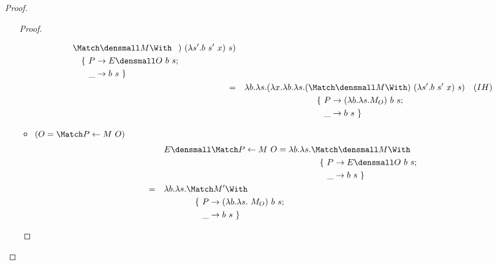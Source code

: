 \begin{proof}
\begin{enumerate}[(a)]
\begin{proof}
\begin{itemize}
\begin{align*}
            \begin{aligned}[t]
              &\Match \den{M} \With \\
              &\quad
              \begin{aligned}[t]
                \{~
                P &\to E\den{O}~b~s; \\
                \_ &\to b~s
                ~\}
              \end{aligned}
            \end{aligned}
            )~ (\lambda s'. b ~ s' ~ x) ~ s) \\
            =& \quad \lambda b. \lambda s. (\lambda x. \lambda b. \lambda s. (
            \begin{aligned}[t]
              &\Match \den{M} \With \\
              &\quad
              \begin{aligned}[t]
                \{~
                P &\to (\lambda b. \lambda s. M_O)~b~s; \\
                \_ &\to b~s
                ~\}
              \end{aligned}
            \end{aligned}
            )~ (\lambda s'. b ~ s' ~ x) ~ s) & (IH)
            \end{align*}
    \item $(O = \Match P \gets M ~ O)$
        \begin{align*}
            & \quad E\den{\Match P \gets M ~ O} = \lambda b. \lambda s.
            \begin{aligned}[t]
              &\Match \den{M} \With \\
              &\quad
              \begin{aligned}[t]
                \{~
                P &\to E\den{O}~b~s; \\
                \_ &\to b~s
                ~\}
              \end{aligned}
            \end{aligned} \\
            =& \quad \lambda b. \lambda s.
            \begin{aligned}[t]
              &\Match M' \With \\
              &\quad
              \begin{aligned}[t]
                \{~
                P &\to (\lambda b. \lambda s.~ M_O) ~b~s; \\
                \_ &\to b~s
                ~\}
              \end{aligned}

\end{aligned}
\end{align*}
\end{itemize}
\end{proof}
\end{enumerate}
\end{proof}
